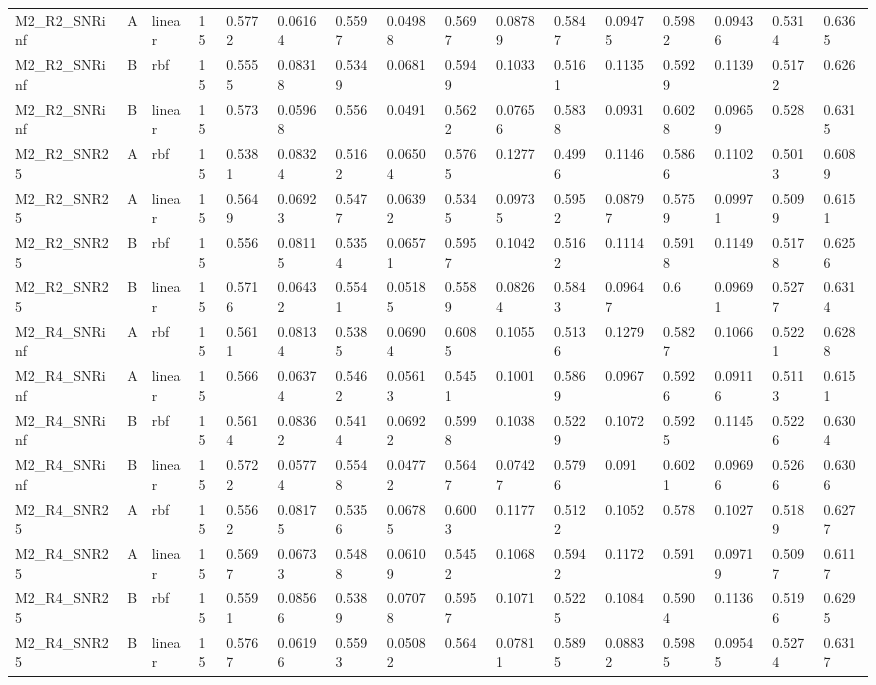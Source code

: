 \begin{tabular}{llllllllllllllll}
M2\_R2\_SNRinf & A & linear & 15 & 0.5772 & 0.06164 & 0.5597 & 0.04988 & 0.5697 & 0.08789 & 0.5847 & 0.09475 & 0.5982 & 0.09436 & 0.5314 & 0.6365 \\
M2\_R2\_SNRinf & B & rbf & 15 & 0.5555 & 0.08318 & 0.5349 & 0.0681 & 0.5949 & 0.1033 & 0.5161 & 0.1135 & 0.5929 & 0.1139 & 0.5172 & 0.626 \\
M2\_R2\_SNRinf & B & linear & 15 & 0.573 & 0.05968 & 0.556 & 0.0491 & 0.5622 & 0.07656 & 0.5838 & 0.0931 & 0.6028 & 0.09659 & 0.528 & 0.6315 \\
M2\_R2\_SNR25 & A & rbf & 15 & 0.5381 & 0.08324 & 0.5162 & 0.06504 & 0.5765 & 0.1277 & 0.4996 & 0.1146 & 0.5866 & 0.1102 & 0.5013 & 0.6089 \\
M2\_R2\_SNR25 & A & linear & 15 & 0.5649 & 0.06923 & 0.5477 & 0.06392 & 0.5345 & 0.09735 & 0.5952 & 0.08797 & 0.5759 & 0.09971 & 0.5099 & 0.6151 \\
M2\_R2\_SNR25 & B & rbf & 15 & 0.556 & 0.08115 & 0.5354 & 0.06571 & 0.5957 & 0.1042 & 0.5162 & 0.1114 & 0.5918 & 0.1149 & 0.5178 & 0.6256 \\
M2\_R2\_SNR25 & B & linear & 15 & 0.5716 & 0.06432 & 0.5541 & 0.05185 & 0.5589 & 0.08264 & 0.5843 & 0.09647 & 0.6 & 0.09691 & 0.5277 & 0.6314 \\
M2\_R4\_SNRinf & A & rbf & 15 & 0.5611 & 0.08134 & 0.5385 & 0.06904 & 0.6085 & 0.1055 & 0.5136 & 0.1279 & 0.5827 & 0.1066 & 0.5221 & 0.6288 \\
M2\_R4\_SNRinf & A & linear & 15 & 0.566 & 0.06374 & 0.5462 & 0.05613 & 0.5451 & 0.1001 & 0.5869 & 0.0967 & 0.5926 & 0.09116 & 0.5113 & 0.6151 \\
M2\_R4\_SNRinf & B & rbf & 15 & 0.5614 & 0.08362 & 0.5414 & 0.06922 & 0.5998 & 0.1038 & 0.5229 & 0.1072 & 0.5925 & 0.1145 & 0.5226 & 0.6304 \\
M2\_R4\_SNRinf & B & linear & 15 & 0.5722 & 0.05774 & 0.5548 & 0.04772 & 0.5647 & 0.07427 & 0.5796 & 0.091 & 0.6021 & 0.09696 & 0.5266 & 0.6306 \\
M2\_R4\_SNR25 & A & rbf & 15 & 0.5562 & 0.08175 & 0.5356 & 0.06785 & 0.6003 & 0.1177 & 0.5122 & 0.1052 & 0.578 & 0.1027 & 0.5189 & 0.6277 \\
M2\_R4\_SNR25 & A & linear & 15 & 0.5697 & 0.06733 & 0.5488 & 0.06109 & 0.5452 & 0.1068 & 0.5942 & 0.1172 & 0.591 & 0.09719 & 0.5097 & 0.6117 \\
M2\_R4\_SNR25 & B & rbf & 15 & 0.5591 & 0.08566 & 0.5389 & 0.07078 & 0.5957 & 0.1071 & 0.5225 & 0.1084 & 0.5904 & 0.1136 & 0.5196 & 0.6295 \\
M2\_R4\_SNR25 & B & linear & 15 & 0.5767 & 0.06196 & 0.5593 & 0.05082 & 0.564 & 0.07811 & 0.5895 & 0.08832 & 0.5985 & 0.09545 & 0.5274 & 0.6317 \\

\end{tabular}
